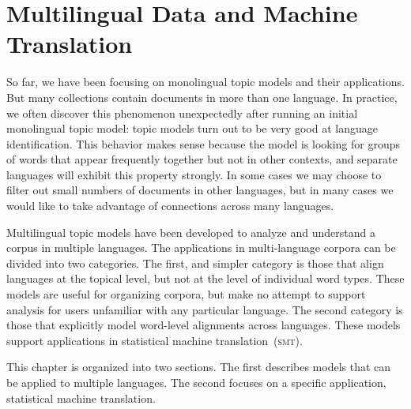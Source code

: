 \chapter{Multilingual Data and Machine Translation}
\label{ch:mt}

So far, we have been focusing on monolingual topic models and their applications.
But many collections contain documents in more than one language.
In practice, we often discover this phenomenon unexpectedly after running an initial monolingual topic model: topic models turn out to be very good at language identification.
This behavior makes sense because the model is looking for groups of words that appear frequently together but not in other contexts, and separate languages will exhibit this property strongly.
In some cases we may choose to filter out small numbers of documents in other languages, but in many cases we would like to take advantage of  connections across many languages.

Multilingual topic models have been developed to analyze and understand a corpus in multiple languages.
The applications in multi-language corpora can be divided into two categories.
The first, and simpler category is those that align languages at the topical level, but not at the level of individual word types.
These models are useful for organizing corpora, but make no attempt to support analysis for users unfamiliar with any particular language.
The second category is those that explicitly model word-level alignments across languages.
These models support applications in statistical machine translation~(\textsc{smt}).

This chapter is organized into two sections. The first describes models that can be applied to multiple languages. The second focuses on a specific application, statistical machine translation.

